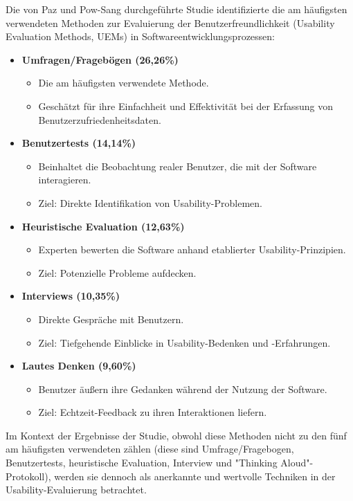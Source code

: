 \documentclass[12pt,oneside]{article}
\begin{document}
Die von Paz und Pow-Sang durchgeführte Studie \cite{Paz2016} identifizierte die am häufigsten verwendeten Methoden zur Evaluierung der Benutzerfreundlichkeit (Usability Evaluation Methods, UEMs) in Softwareentwicklungsprozessen:

\begin{itemize}
    \item \textbf{Umfragen/Fragebögen (26,26\%)} 
    \begin{itemize}
        \item Die am häufigsten verwendete Methode.
        \item Geschätzt für ihre Einfachheit und Effektivität bei der Erfassung von Benutzerzufriedenheitsdaten.
    \end{itemize}
    \item \textbf{Benutzertests (14,14\%)}
    \begin{itemize}
        \item Beinhaltet die Beobachtung realer Benutzer, die mit der Software interagieren.
        \item Ziel: Direkte Identifikation von Usability-Problemen.
    \end{itemize}
    \item \textbf{Heuristische Evaluation (12,63\%)}
    \begin{itemize}
        \item Experten bewerten die Software anhand etablierter Usability-Prinzipien.
        \item Ziel: Potenzielle Probleme aufdecken.
    \end{itemize}
    \item \textbf{Interviews (10,35\%)}
    \begin{itemize}
        \item Direkte Gespräche mit Benutzern.
        \item Ziel: Tiefgehende Einblicke in Usability-Bedenken und -Erfahrungen.
    \end{itemize}
    \item \textbf{Lautes Denken (9,60\%)}
    \begin{itemize}
        \item Benutzer äußern ihre Gedanken während der Nutzung der Software.
        \item Ziel: Echtzeit-Feedback zu ihren Interaktionen liefern.
    \end{itemize}
\end{itemize}

Im Kontext der Ergebnisse der Studie, obwohl diese Methoden nicht zu den fünf am häufigsten verwendeten zählen (diese sind Umfrage/Fragebogen, Benutzertests, heuristische Evaluation, Interview und "Thinking Aloud"-Protokoll), werden sie dennoch als anerkannte und wertvolle Techniken in der Usability-Evaluierung betrachtet.
\end{document}
